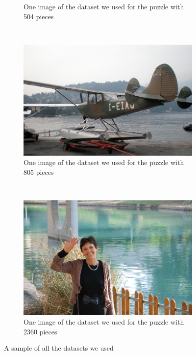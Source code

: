 \documentclass[11pt]{report}
\begin{document}
\begin{figure}
\begin{subfigure}[b]{0.45\textwidth}
		\caption{One image of the dataset we used for the puzzle with 504 pieces}
		\label{img:540}
	\end{subfigure}
	~
	\begin{subfigure}[b]{0.45\textwidth}
		\includegraphics[width=\textwidth]{../imData/805/1.jpg}
		\caption{One image of the dataset we used for the puzzle with 805 pieces}
		\label{img:805}
	\end{subfigure}
	~
	\begin{subfigure}[b]{0.45\textwidth}
		\includegraphics[width=\textwidth]{../imData/2360/1.jpg}
		\caption{One image of the dataset we used for the puzzle with 2360 pieces}
		\label{img:2360}
	\end{subfigure}

	\caption{A sample of all the datasets we used}
	\label{fig:database}
\end{figure}
\end{document}
